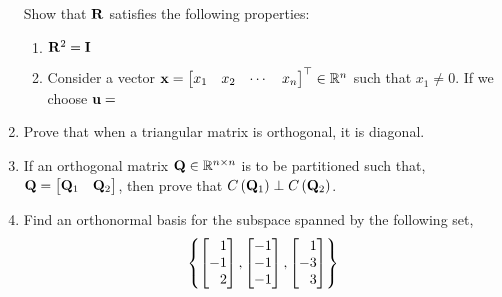 \begin{enumerate}[resume]
    Show that $\mathbf{R}$ satisfies the following properties:
    \begin{enumerate}
        \item $\mathbf{R}^2 = \mathbf{I}$
        \item Consider a vector $\mf{x} = \bmx x_1 & x_2 & \cdots & x_n \emx^\top \in \mb{R}^n$ such that $x_1 \neq 0$. If we choose $\mathbf{u} = $
    \end{enumerate}

    \item Prove that when a triangular matrix is orthogonal, it is diagonal.

    \item If an orthogonal matrix $\mathbf{Q} \in \mathbb{R}^{n \times n}$ is to be partitioned such that, $\mf{Q} = \bmx \mf{Q}_1 & \mf{Q}_2\emx$, then prove that $C\left(\mathbf{Q}_1\right) \perp C\left(\mathbf{Q}_2\right)$.

    \item Find an orthonormal basis for the subspace spanned by the following set,
    $$\lc \bmx1\\-1\\2\emx, \bmx-1\\-1\\-1\emx, \bmx1\\-3\\3\emx \rc$$

\end{enumerate}
